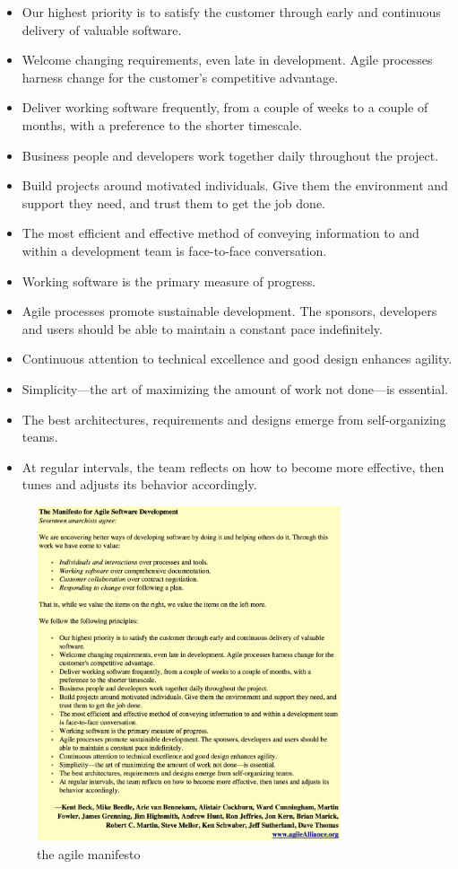 \begin{itemize}
  \item Our highest priority is to satisfy the customer through early and continuous delivery of valuable software.
  \item Welcome changing requirements, even late in development. Agile processes harness change for the customer's competitive advantage.
  \item Deliver working software frequently, from a couple of weeks to a couple of months, with a preference to the shorter timescale.
  \item Business people and developers work together daily throughout the project.
  \item Build projects around motivated individuals. Give them the environment and support they need, and trust them to get the job done.
  \item The most efficient and effective method of conveying information to and within a development team is face-to-face conversation.
  \item Working software is the primary measure of progress.
  \item Agile processes promote sustainable development. The sponsors, developers and users should be able to maintain a constant pace indefinitely.
  \item Continuous attention to technical excellence and good design enhances agility.
  \item Simplicity—the art of maximizing the amount of work not done—is essential.
  \item The best architectures, requirements and designs emerge from self-organizing teams.
  \item At regular intervals, the team reflects on how to become more effective, then tunes and adjusts its behavior accordingly.
\end{itemize} \cite{fowler2001agile}

\begin{figure}[h!]
  \centering
  \includegraphics[width=0.8\textwidth]{images/manifesto.png}
  \caption{the agile manifesto}
\end{figure}

